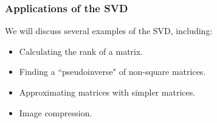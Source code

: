 \documentclass{beamer}
\begin{document}
\begin{frame}
\frametitle{Applications of the SVD}

We will discuss several examples of the SVD, including:
\begin{itemize}
	\item Calculating the rank of a matrix.
	\item Finding a ``pseudoinverse" of non-square matrices.
	\item Approximating matrices with simpler matrices.
	\item Image compression.
\end{itemize}	
\end{frame}
\end{document}
